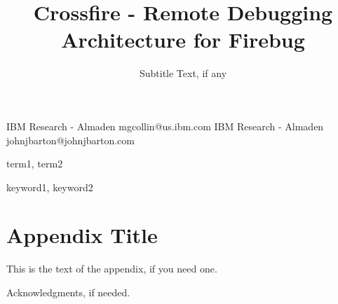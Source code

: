 \documentclass[preprint]{sigplanconf}
\begin{document}
\copyrightdata{[to be supplied]}


\title{Crossfire - Remote Debugging Architecture for Firebug}
\subtitle{Subtitle Text, if any}

           {IBM Research - Almaden}
           {mgcollin@us.ibm.com}
           {IBM Research - Almaden}
           {johnjbarton@johnjbarton.com}

\maketitle




\terms
term1, term2

\keywords
keyword1, keyword2









\appendix
\section{Appendix Title}

This is the text of the appendix, if you need one.

\acks

Acknowledgments, if needed.








\end{document}
